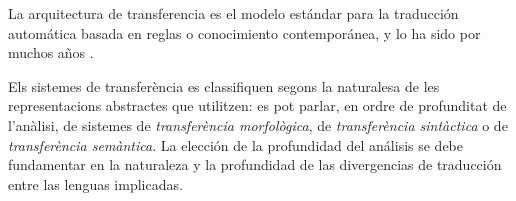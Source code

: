 La arquitectura de transferencia es el modelo estándar para la traducción automática basada en reglas o conocimiento contemporánea, y lo ha sido por muchos años \citep{arnold93j}. 

Els sistemes de transferència es classifiquen segons la naturalesa de les representacions abstractes que utilitzen: es pot parlar, en ordre de profunditat de l'anàlisi, de sistemes de \emph{transferència morfològica}, de \emph{transferència sintàctica} o de {\em transferència semàntica}. La elección de la profundidad del análisis se debe fundamentar en la naturaleza y la profundidad de las divergencias de traducción \citep{vandooren93b} entre las lenguas implicadas. 

